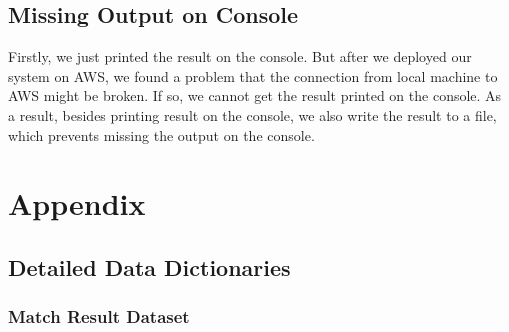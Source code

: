 \documentclass{article}
\begin{document}
\subsection{Missing Output on Console}

Firstly, we just printed the result on the console.
But after we deployed our system on AWS, we found a problem that the connection from local machine to AWS might be broken.
If so, we cannot get the result printed on the console.
As a result, besides printing result on the console, we also write the result to a file, which prevents missing the output on the console.

\printglossary

\section{Appendix}

\subsection{Detailed Data Dictionaries}

\subsubsection{Match Result Dataset}
\end{document}
